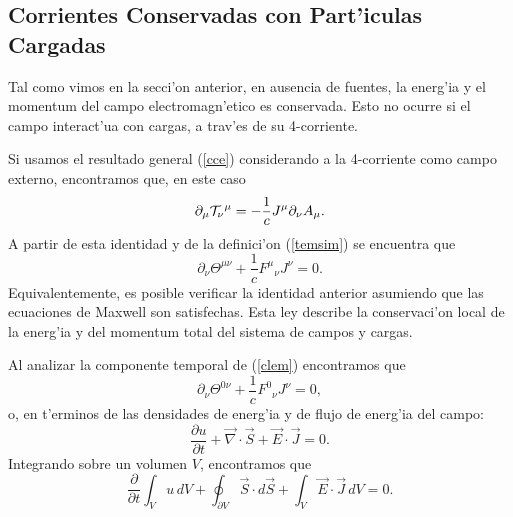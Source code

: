 
\subsection{Corrientes Conservadas con Part'iculas Cargadas}
Tal como vimos en la secci'on anterior, en ausencia de fuentes, la energ'ia y
el momentum del campo electromagn'etico es conservada. Esto no ocurre si el
campo interact'ua con cargas, a trav'es de su 4-corriente.

 Si usamos el resultado general (\ref{cce}) considerando a la 4-corriente como
campo externo, encontramos que, en este caso
 \begin{equation}
\partial_\mu{\cal T}_\nu{}^\mu=-\frac{1}{c}J^\mu\partial_\nu A_\mu.
\end{equation}
A partir de esta identidad y de la definici'on (\ref{temsim}) se encuentra que
\begin{equation}
\boxed{\partial_\nu \Theta^{\mu\nu}+\frac{1}{c} F^\mu{}_\nu J^\nu=0.}
\label{clem}
\end{equation}%
Equivalentemente, es posible verificar la identidad anterior asumiendo que las
ecuaciones de Maxwell son satisfechas. Esta ley describe la conservaci'on local
de la energ'ia y del momentum total del sistema de campos y cargas.

Al analizar la componente temporal de (\ref{clem}) encontramos que
\begin{equation}
\partial_\nu \Theta^{0\nu}+\frac{1}{c}F^0{}_\nu J^\nu=0,
\end{equation}
o, en t'erminos de las densidades de energ'ia y de flujo de energ'ia del campo:
\begin{equation}
\frac{\partial u}{\partial
t}+\vec{\nabla}\cdot\vec{S}+\vec{E}\cdot\vec{J}  =0.
\end{equation}
Integrando sobre un volumen $V$, encontramos que
\begin{equation}
\frac{\partial}{\partial t}\int_V u\,dV+\oint_{\partial V}
\vec{S}\cdot d\vec{S}+\int_V \vec{E}\cdot\vec{J}\,dV =0 .\label{clen}
\end{equation}

